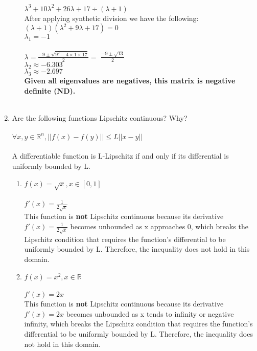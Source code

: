 \documentclass{assignment}
\newcommand{\R}{\mathbb{R}}
\begin{document}
\begin{problem}
\begin{enumerate}
\begin{enumerate}[label=\alph*)]
    $\lambda^3 + 10\lambda^2+26\lambda+17 \div (\lambda + 1)$\\

    After applying synthetic division we have the following:\\
    $(\lambda+1)(\lambda^2+9\lambda+17) = 0$\\
    $\lambda_1 = -1$\\\\
    
    $\lambda=\frac{-9 \pm \sqrt{9^2-4 \times1 \times 17}}{2} = $
    $\frac{-9 \pm \sqrt{13}}{2}$\\
    $\lambda_2 \approx -6.303$\\
    $\lambda_3 \approx -2.697$\\

    \textbf{Given all eigenvalues are negatives, this matrix is negative definite (ND).}\\\\
    
\end{enumerate}

\item Are the following functions Lipschitz continuous? Why?\\\\
$\forall x,y \in \R^n, ||f(x) - f(y)|| \leq L||x-y||$\\\\
A differentiable function is L-Lipschitz if and only if its differential is uniformly bounded by L.
\begin{enumerate}
    \item $f(x) = \sqrt{x},x \in [0,1]$\\\\
    $f'(x) = \frac{1}{2\sqrt{x}}$\\

    This function is \textbf{not} Lipschitz continuous because its derivative $f'(x) = \frac{1}{2\sqrt{x}}$ becomes unbounded as x approaches 0, which breaks the Lipschitz condition that requires the function's differential to be uniformly bounded by L. Therefore, the inequality does not hold in this domain.\\


    \item $f(x) = x^2, x \in \R$\\\\
    $f'(x) = 2x$\\

    This function is \textbf{not} Lipschitz continuous because its derivative $f'(x) = 2x$ becomes unbounded as x tends to infinity or negative infinity, which breaks the Lipschitz condition that requires the function's differential to be uniformly bounded by L. Therefore, the inequality does not hold in this domain.\\


\end{enumerate}
\end{enumerate}
\end{problem}
\end{document}
